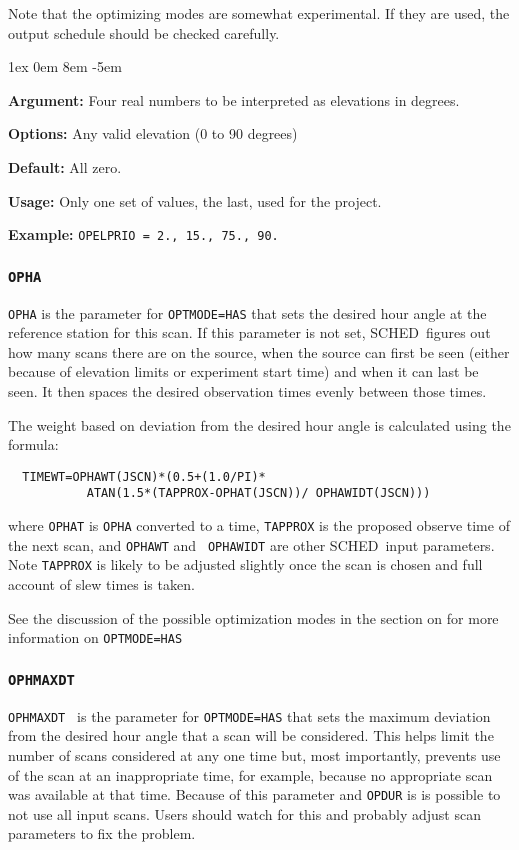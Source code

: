 \documentclass{report}
\newcommand{\schedb}{{\sc SCHED~}}
\newcommand{\rcwbox}[5]{
  \begin{list}{}{\parsep 1ex  \itemsep 0em
                 \leftmargin 8em  \itemindent -5em }
    \item {\bf Argument:} #1
    \item {\bf Options:}  #2
    \item {\bf Default:}  #3
    \item {\bf Usage:}    #4
    \item {\bf Example:}  #5
  \end{list}
}
\begin{document}
Note that the optimizing modes are somewhat experimental.  If they are
used, the output schedule should be checked carefully.

\rcwbox
{Four real numbers to be interpreted as elevations in degrees.}
{Any valid elevation (0 to 90 degrees)}
{All zero.}
{Only one set of values, the last, used for the project.}
{{\tt OPELPRIO = 2., 15., 75., 90.}}

\subsubsection{\label{MP:OPHA}{\tt OPHA}}

{\tt OPHA} is the parameter for {\tt OPTMODE=HAS} that sets the desired
hour angle at the reference station 
for this scan.  If this parameter is not set, \schedb figures out how
many scans there are on the source, when the source can first be
seen (either because of elevation limits or experiment start time) and
when it can last be seen.  It then spaces the desired observation times
evenly between those times.

The weight based on deviation from the desired hour angle is calculated
using the formula:
\begin{verbatim}
  TIMEWT=OPHAWT(JSCN)*(0.5+(1.0/PI)*
           ATAN(1.5*(TAPPROX-OPHAT(JSCN))/ OPHAWIDT(JSCN)))
\end{verbatim}
where {\tt OPHAT} is {\tt OPHA} converted to a time, {\tt TAPPROX} is the
proposed observe time of the next scan, and {\tt OPHAWT} and {\tt
OPHAWIDT} are other \schedb input parameters.  Note {\tt TAPPROX} is
likely to be adjusted slightly once the scan is chosen and full
account of slew times is taken.

See the discussion of the possible optimization modes in the section
on  for more information on
{\tt OPTMODE=HAS}

\subsubsection{\label{MP:OPHMAXDT}{\tt OPHMAXDT}}

{\tt OPHMAXDT } is the parameter for {\tt OPTMODE=HAS} that sets
the maximum deviation from the desired hour angle that a scan will
be considered.  This helps limit the number of scans considered at
any one time but, most importantly, prevents use of the scan at an
inappropriate time, for example, because no appropriate scan was
available at that time.  Because of this parameter and {\tt OPDUR}
is is possible to not use all input scans.  Users should watch for
this and probably adjust scan parameters to fix the problem.
\end{document}
